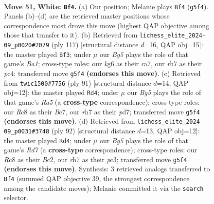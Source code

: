 \documentclass[11pt]{article}
\begin{document}
\clearpage

\begin{figure}[p]\centering
\begin{subfigure}{0.46\textwidth}\centering
\resizebox{\linewidth}{!}{%
\newchessgame
\chessboard[
  setfen={2R5/7r/rp4k1/6B1/1p1P4/3K4/8/8 w - - 5 51},
  showmover=false,
  pgfstyle=straightmove, color=movearrow, markmove={g5-f4}
]}
\caption{}
\end{subfigure}\hfill
\begin{subfigure}{0.46\textwidth}\centering
\resizebox{\linewidth}{!}{%
\newchessgame
\chessboard[
  setfen={b7/R7/5k2/4pp2/2P4P/2K5/5P2/8 b - - 4 59},
  showmover=false,
  pgfstyle=straightmove, color=movearrow, markmove={a8-f3}
]}
\caption{}
\end{subfigure}
\\[4pt]
\begin{subfigure}{0.46\textwidth}\centering
\resizebox{\linewidth}{!}{%
\newchessgame
\chessboard[
  setfen={8/2bP3R/5kp1/7p/r7/1K6/5P2/8 b - - 1 46},
  showmover=false,
  pgfstyle=straightmove, color=movearrow, markmove={a4-d4}
]}
\caption{}
\end{subfigure}\hfill
\begin{subfigure}{0.46\textwidth}\centering
\resizebox{\linewidth}{!}{%
\newchessgame
\chessboard[
  setfen={4k3/3R4/5K2/p7/8/P1p4r/2B5/8 w - - 4 47},
  showmover=false,
  pgfstyle=straightmove, color=movearrow, markmove={d7-d4}
]}
\caption{}
\end{subfigure}
\caption{\textbf{Move 51, White: \texttt{Bf4}.} (a) Our position; Melanie plays \texttt{Bf4} (\texttt{g5f4}). Panels (b)--(d) are the retrieved master positions whose correspondence most drove this move (highest QAP objective among those that transfer to it). (b) Retrieved from \texttt{lichess\_elite\_2024-09\_p0020\#2079} (ply 117) [structural distance $d$=16, QAP obj=15]: the master played \texttt{Bf3}; under $\mu$ our \emph{Bg5} plays the role of that game's \emph{Ba1}; cross-type roles: our \emph{k}g6 as their \emph{r}a7, our \emph{r}h7 as their \emph{p}c4; transferred move \texttt{g5f4} \textbf{(endorses this move)}. (c) Retrieved from \texttt{twic1500\#7756} (ply 91) [structural distance $d$=14, QAP obj=12]: the master played \texttt{Rd4}; under $\mu$ our \emph{Bg5} plays the role of that game's \emph{Ra5} (a \textbf{cross-type} correspondence); cross-type roles: our \emph{R}c8 as their \emph{B}c7, our \emph{r}h7 as their \emph{p}d7; transferred move \texttt{g5f4} \textbf{(endorses this move)}. (d) Retrieved from \texttt{lichess\_elite\_2024-09\_p0031\#3748} (ply 92) [structural distance $d$=13, QAP obj=12]: the master played \texttt{Rd4}; under $\mu$ our \emph{Bg5} plays the role of that game's \emph{Rd7} (a \textbf{cross-type} correspondence); cross-type roles: our \emph{R}c8 as their \emph{B}c2, our \emph{r}h7 as their \emph{p}c3; transferred move \texttt{g5f4} \textbf{(endorses this move)}. Synthesis: 3 retrieved analogs transferred to \texttt{Bf4} (summed QAP objective 39, the strongest correspondence among the candidate moves); Melanie committed it via the \texttt{search} selector.}
\label{fig:thought-m100}
\end{figure}
\end{document}

